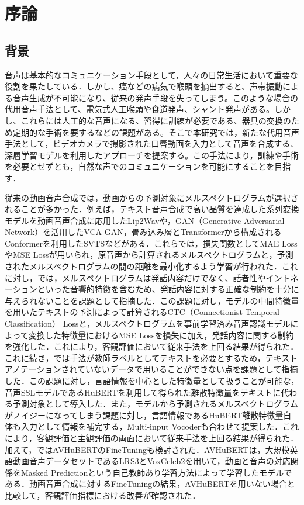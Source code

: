 \section{序論}
\subsection{背景}
音声は基本的なコミュニケーション手段として，人々の日常生活において重要な役割を果たしている．しかし、癌などの病気で喉頭を摘出すると、声帯振動による音声生成が不可能になり、従来の発声手段を失ってしまう。このような場合の代用音声手法として、電気式人工喉頭や食道発声、シャント発声がある。しかし、これらには人工的な音声になる、習得に訓練が必要である、器具の交換のため定期的な手術を要するなどの課題がある。そこで本研究では，新たな代用音声手法として，ビデオカメラで撮影された口唇動画を入力として音声を合成する、深層学習モデルを利用したアプローチを提案する。この手法により，訓練や手術を必要とせずとも，自然な声でのコミュニケーションを可能にすることを目指す．

従来の動画音声合成では，動画からの予測対象にメルスペクトログラムが選択されることが多かった．例えば，テキスト音声合成で高い品質を達成した系列変換モデル\cite{shen2018natural}を動画音声合成に応用したLip2Wav\cite{prajwal2020learning}や，GAN（Generative Adversarial Network）を活用したVCA-GAN\cite{kim2021lip}，畳み込み層とTransformer\cite{vaswani2017attention}から構成されるConformer\cite{gulati2020conformer}を利用したSVTS\cite{mira2022svts}などがある．これらでは，損失関数としてMAE LossやMSE Lossが用いられ，原音声から計算されるメルスペクトログラムと，予測されたメルスペクトログラムの間の距離を最小化するよう学習が行われた．これに対し，\cite{kim2023lip_multitask}では，メルスペクトログラムは発話内容だけでなく、話者性やイントネーションといった音響的特徴を含むため、発話内容に対する正確な制約を十分に与えられないことを課題として指摘した．この課題に対し，モデルの中間特徴量を用いたテキストの予測によって計算されるCTC（Connectionist Temporal Classification） Lossと，メルスペクトログラムを事前学習済み音声認識モデルによって変換した特徴量におけるMSE Lossを損失に加え，発話内容に関する制約を強化した．これにより，客観評価において従来手法を上回る結果が得られた．これに続き，\cite{choi2023intelligible}では手法\cite{kim2023lip_multitask}が教師ラベルとしてテキストを必要とするため，テキストアノテーションされていないデータで用いることができない点を課題として指摘した．この課題に対し，言語情報を中心とした特徴量として扱うことが可能な，音声SSLモデルであるHuBERT\cite{hsu2021hubert}を利用して得られた離散特徴量をテキストに代わる予測対象として導入した．また，モデルから予測されるメルスペクトログラムがノイジーになってしまう課題に対し，言語情報であるHuBERT離散特徴量自体も入力として情報を補完する，Multi-input Vocoderも合わせて提案した．これにより，客観評価と主観評価の両面において従来手法を上回る結果が得られた．加えて，\cite{choi2023intelligible}ではAVHuBERT\cite{shi2022learning}のFineTuningも検討された．AVHuBERTは，大規模英語動画音声データセットであるLRS3\cite{afouras2018lrs3}とVoxCeleb2\cite{chung2018voxceleb2}を用いて，動画と音声の対応関係をMasked Predictionという自己教師あり学習方法によって学習したモデルである．動画音声合成に対するFineTuningの結果，AVHuBERTを用いない場合と比較して，客観評価指標における改善が確認された．

